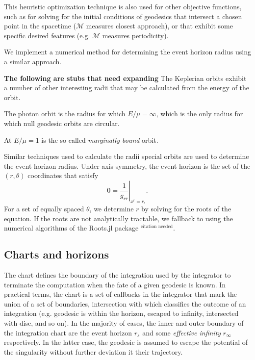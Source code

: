 \documentclass[fleqn,usenatbib]{mnras}
\newcommand{\citneeded}{{\bf \color{red} $^{\text{citation needed}}$}}
\newcommand{\todo}[1]{{\bf \color{red} #1}}
\begin{document}
This heuristic optimization technique is also used for other objective
functions, such as for solving for the initial conditions of  geodesics that
intersect a chosen point in the spacetime ($\mathscr{M}$ measures closest
approach), or that exhibit some specific desired features (e.g. $\mathscr{M}$
measures periodicity).

We implement a numerical method for determining the event horizon radius using a
similar approach.

\todo{The following are stubs that need expanding}
The Keplerian orbits exhibit a number of other interesting radii that may be
calculated from the energy of the orbit. 

The photon orbit is the radius for which $E / \mu = \infty$, which is the only
radius for which null geodesic orbits are circular. 

At $E / \mu = 1$ is the so-called \emph{marginally bound} orbit.

Similar techniques used to calculate the radii special orbits are used to
determine the event horizon radius. Under axis-symmetry, the event horizon is
the set of the $(r, \theta)$ coordinates that satisfy
\begin{equation}
    \label{eq:event_horizon}
    0 = \left. \frac{1}{g_{rr}} \right\rvert_{x^r = r_s}.
\end{equation}
For a set of equally spaced $\theta$, we determine $r$ by solving for the roots
of the equation. If the roots are not analytically tractable, we fallback to
using the numerical algorithms of the Roots.jl package\citneeded.

\subsection{Charts and horizons}

The chart defines the boundary of the integration used by the integrator to
terminate the computation when the fate of a given geodesic is known. In
practical terms, the chart is a set of callbacks in the integrator that mark the
union of a set of boundaries, intersection with which classifies the outcome of
an integration (e.g. geodesic is within the horizon, escaped to infinity, intersected with
disc, and so on). In the majority of cases, the inner and outer boundary of the integration
chart are the event horizon $r_s$ and some \emph{effective infinity} $r_\infty$
respectively. In the latter case, the geodesic is assumed to escape the
potential of the singularity without further deviation it their trajectory.
\end{document}
